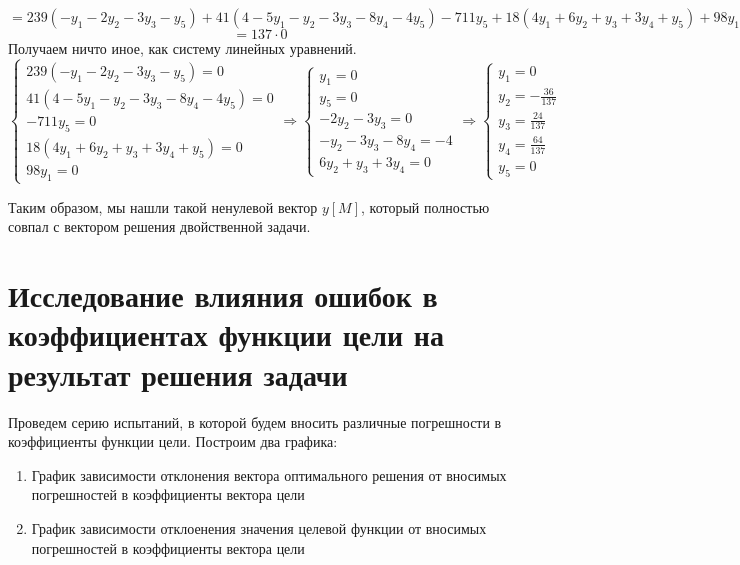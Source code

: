 \documentclass{article}
\begin{document}
\begin{equation*}
   = 239(-y_1-2y_2-3y_3-y_5)+41(4-5y_1-y_2-3y_3-8y_4-4y_5)-711y_5+18(4y_1+6y_2+y_3+3y_4+y_5)+98y_1
\end{equation*}
\begin{equation*}
   = 137 \cdot 0
\end{equation*}
Получаем ничто иное, как систему линейных уравнений.
\begin{equation*}
    \begin{cases}
      239(-y_1-2y_2-3y_3-y_5)=0\\
      41(4-5y_1-y_2-3y_3-8y_4-4y_5)=0\\
      -711y_5=0\\
      18(4y_1+6y_2+y_3+3y_4+y_5)=0\\
      98y_1=0
    \end{cases}
    \Rightarrow
    \begin{cases}
     y_1=0\\
     y_5=0\\
     -2y_2-3y_3=0\\
     -y_2-3y_3-8y_4=-4\\
     6y_2+y_3+3y_4=0
    \end{cases}
    \Rightarrow
    \begin{cases}
     y_1=0\\
     y_2=-\frac{36}{137}\\
     y_3=\frac{24}{137}\\
     y_4=\frac{64}{137}\\
     y_5=0
    \end{cases}
\end{equation*}

\noindent Таким образом, мы нашли такой ненулевой вектор $y[M]$, который полностью совпал с вектором решения двойственной задачи.

\section{Исследование влияния ошибок в коэффициентах функции цели на результат решения задачи}
\noindent Проведем серию испытаний, в которой будем вносить различные погрешности в коэффициенты функции цели. Построим два графика:
\begin{enumerate}
    \item График зависимости отклонения вектора оптимального решения от вносимых погрешностей в коэффициенты вектора цели
    \item График зависимости отклоенения значения целевой функции от вносимых погрешностей в коэффициенты вектора цели
\end{enumerate} 
\end{document}
